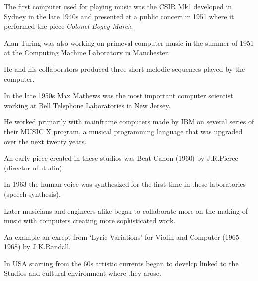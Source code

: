 The first computer used for playing music was the CSIR Mk1 developed in Sydney in the late 1940s and presented at a public concert in 1951 where
it performed the piece \textit{Colonel Bogey March}.

Alan Turing was also working on primeval computer music in the summer of 1951 at the Computing Machine Laboratory in Manchester.

He and his collaborators produced three short melodic sequences played by the computer.

In the late 1950s Max Mathews was the most important computer scientist working at Bell Telephone Laboratories in New Jersey.

He worked primarily with mainframe computers made by IBM on several series of their MUSIC X program, a musical programming language that was upgraded over the next twenty years.

An early piece created in these studios was Beat Canon (1960) by J.R.Pierce (director of studio).

In 1963 the human voice was synthesized for the first time in these laboratories (speech synthesis).

Later musicians and engineers alike began to collaborate more on the making of music with computers creating more sophisticated work.

Aa example an exrept from `Lyric Variations' for Violin and Computer (1965-1968) by J.K.Randall.

In USA starting from the 60s artistic currents began to develop linked to the Studios and cultural environment where they arose.

